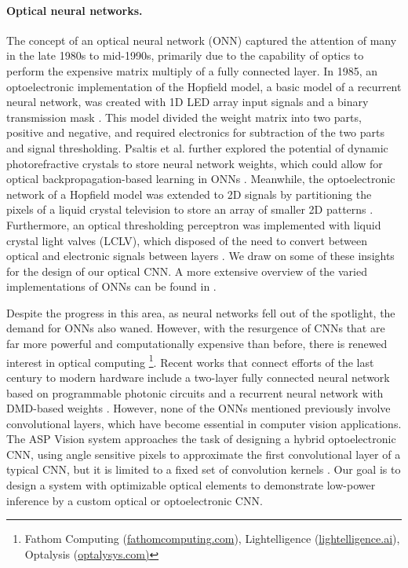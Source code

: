 \paragraph{Optical neural networks.}   
The concept of an optical neural network (ONN) captured the attention of many in the late 1980s to mid-1990s, primarily due to the capability of optics to perform the expensive matrix multiply of a fully connected layer. In 1985, an optoelectronic implementation of the Hopfield model, a basic model of a recurrent neural network, was created with 1D LED array input signals and a binary transmission mask \cite{farhat1985optical}. This model divided the weight matrix into two parts, positive and negative, and required electronics for subtraction of the two parts and signal thresholding. Psaltis et al. further explored the potential of dynamic photorefractive crystals to store neural network weights, which could allow for optical backpropagation-based learning in ONNs \cite{psaltis1988adaptive}. Meanwhile, the optoelectronic network of a Hopfield model was extended to 2D signals by partitioning the pixels of a liquid crystal television to store an array of smaller 2D patterns \cite{lu1989two}. Furthermore, an optical thresholding perceptron was implemented with liquid crystal light valves (LCLV), which disposed of the need to convert between optical and electronic signals between layers \cite{saxena1995adaptive}. We draw on some of these insights for the design of our optical CNN. A more extensive overview of the varied implementations of ONNs can be found in \cite{denz2013optical}.

Despite the progress in this area, as neural networks fell out of the spotlight, the demand for ONNs also waned. However, with the resurgence of CNNs that are far more powerful and computationally expensive than before, there is renewed interest in optical computing \footnote{Fathom Computing (\url{fathomcomputing.com}), Lightelligence (\url{lightelligence.ai}), Optalysis (\url{optalysys.com)}}. Recent works that connect efforts of the last century to modern hardware include a two-layer fully connected neural network based on programmable photonic circuits \cite{shen2017deep} and a recurrent neural network with DMD-based weights \cite{bueno2017reinforcement}. However, none of the ONNs mentioned previously involve convolutional layers, which have become essential in computer vision applications. The ASP Vision system approaches the task of designing a hybrid optoelectronic CNN, using angle sensitive pixels to approximate the first convolutional layer of a typical CNN, but it is limited to a fixed set of convolution kernels \cite{chen2016asp}. Our goal is to design a system with optimizable optical elements to demonstrate low-power inference by a custom optical or optoelectronic CNN.

